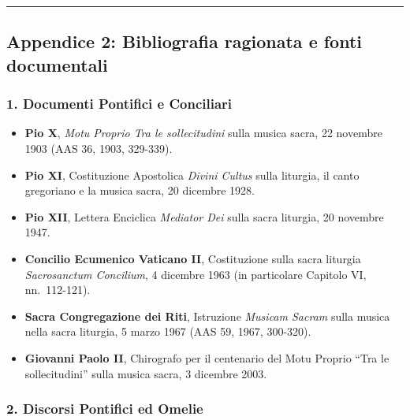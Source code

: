 \documentclass[12pt,a4paper]{article}
\begin{document}
	\begin{center}\rule{0.5\linewidth}{0.5pt}\end{center}
	
	\subsection{Appendice 2: Bibliografia ragionata e fonti documentali}\label{appendice-2-bibliografia-ragionata-e-fonti-documentali}
	
	\subsubsection{1. Documenti Pontifici e Conciliari}\label{documenti-pontifici-e-conciliari}
	
	\begin{itemize}[leftmargin=*]
		\item \textbf{Pio X}, \emph{Motu Proprio Tra le sollecitudini} sulla musica sacra, 22 novembre 1903 (AAS 36, 1903, 329-339).
		\item \textbf{Pio XI}, Costituzione Apostolica \emph{Divini Cultus} sulla liturgia, il canto gregoriano e la musica sacra, 20 dicembre 1928.
		\item \textbf{Pio XII}, Lettera Enciclica \emph{Mediator Dei} sulla sacra liturgia, 20 novembre 1947.
		\item \textbf{Concilio Ecumenico Vaticano II}, Costituzione sulla sacra liturgia \emph{Sacrosanctum Concilium}, 4 dicembre 1963 (in particolare Capitolo VI, nn.~112-121).
		\item \textbf{Sacra Congregazione dei Riti}, Istruzione \emph{Musicam Sacram} sulla musica nella sacra liturgia, 5 marzo 1967 (AAS 59, 1967, 300-320).
		\item \textbf{Giovanni Paolo II}, Chirografo per il centenario del Motu Proprio ``Tra le sollecitudini'' sulla musica sacra, 3 dicembre 2003.
	\end{itemize}
	
	\subsubsection{2. Discorsi Pontifici ed Omelie}\label{discorsi-pontifici-ed-omelie}
	
\end{document}
